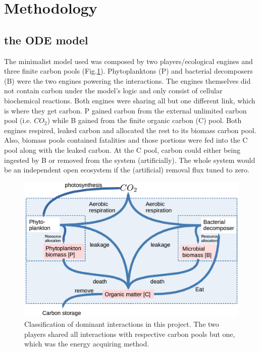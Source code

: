 \documentclass[../thesis.tex]{subfiles} %
\begin{document}
\section{Methodology}

\subsection{the ODE model}
The minimalist model used was composed by two players/ecological engines and three finite carbon pools (Fig.\ref{modelInWord}).  Phytoplanktons (P) and bacterial decomposers (B) were the two engines powering the interactions.  The engines themselves did not contain carbon under the model's logic and only consist of cellular biochemical reactions.  Both engines were sharing all but one different link, which is where they get carbon.  P gained carbon from the external unlimited carbon pool (i.e. $CO_2$) while B gained from the finite organic carbon (C) pool.  Both engines respired, leaked carbon and allocated the rest to its biomass carbon pool.  Also, biomass pools contained fatalities and those portions were fed into the C pool along with the leaked carbon.  At the C pool, carbon could either being ingested by B or removed from the system (artificially).  The whole system would be an independent open ecosystem if the (artificial) removal flux tuned to zero.

\begin{figure}[H]
    \centering
    \includegraphics[width=.8\linewidth]{code/thesisSec/model.png}
    \caption[Model visualization]{Classification of dominant interactions in this project.  The two players shared all interactions with respective carbon pools but one, which was the energy acquiring method.}
    \label{modelInWord}
\end{figure}
\end{document}
